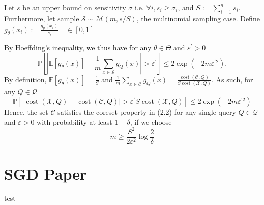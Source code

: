 \documentclass{article}
\theoremstyle{definition}
\begin{document}
Let $s$ be an upper bound on sensitivity $\sigma$ i.e. $\forall i, s_i \geq \sigma_i$, and $S := \sum_{i=1}^n s_i$. Furthermore, let sample  $\mathcal S \sim \mathcal M(m, s/S)$, the multinomial sampling case. Define $g_\theta(x_i) := \frac{q_\theta(x_i)}{s_i}  \quad \in[0,1]$

By Hoeffding's inequality, we thus have for any $\theta \in \Theta$ and $\varepsilon^{\prime}>0$
$$
\mathbb{P}\left[\left|\mathbb{E}\left[g_{\theta}(x)\right]-\frac{1}{m} \sum_{x \in \mathcal{S}} g_{Q}(x)\right|>\varepsilon^{\prime}\right] \leq 2 \exp \left(-2 m \varepsilon^{\prime 2}\right) .
$$
By definition, $\mathbb{E}\left[g_{\theta}(x)\right]=\frac{1}{S}$ and $\frac{1}{m} \sum_{x \in \mathcal{C}} g_{Q}(x)=\frac{\operatorname{cost}(\mathcal{C}, Q)}{S \operatorname{cost}(\mathcal{X}, Q)}$. As such, for any $Q \in \mathcal{Q}$
$$
\mathbb{P}\left[|\operatorname{cost}(\mathcal{X}, Q)-\operatorname{cost}(\mathcal{C}, Q)|>\varepsilon^{\prime} S \operatorname{cost}(\mathcal{X}, Q)\right] \leq 2 \exp \left(-2 m \varepsilon^{\prime 2}\right)
$$
Hence, the set $\mathcal{C}$ satisfies the coreset property in (2.2) for any single query $Q \in \mathcal{Q}$ and $\varepsilon>0$ with probability at least $1-\delta$, if we choose
$$
m \geq \frac{S^{2}}{2 \varepsilon^{2}} \log \frac{2}{\delta}
$$




\section{SGD Paper}
	
	test
	
	\vfill
	
	
	\printbibliography
%	 
%	 
	
\end{document}
